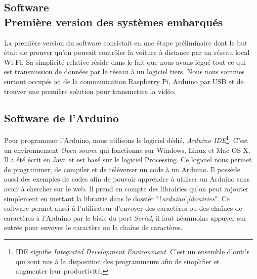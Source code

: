 \documentclass[a4paper,11pt]{report}
\begin{document}
{\begin{enumerate}
\begin{enumerate}
\chapter{Software \\  Première version des systèmes embarqués}

\lettrine{L}{a} première version du software consistait en une étape préliminaire dont le but était de prouver qu'on pouvait contrôler la voiture à distance par un réseau local Wi-Fi. Sa simplicité relative réside dans le fait que nous avons légué tout ce qui est transmission de données par le réseau à un logiciel tiers. Nous nous sommes surtout occupés ici de la communication Raspberry Pi, Arduino par USB et de trouver une première solution pour transmettre la vidéo.

\section{Software de l'Arduino}
Pour programmer l'Arduino, nous utilisons le logiciel dédié, \textit{Arduino IDE}\footnote{IDE signifie \textit{Integrated Development Environment}. C'est un ensemble d'outils qui sont mis à la disposition des programmeurs afin de simplifier et augmenter leur productivité.}. C'est un environnement \textit{Open source} qui fonctionne sur Windows, Linux et Mac OS X. Il a été écrit en Java et est basé sur le logiciel Processing.
Ce logiciel nous permet de programmer, de compiler et de téléverser un code à un Arduino. Il possède aussi des exemples de codes afin de pouvoir apprendre à utiliser un Arduino sans avoir à chercher sur le web. Il prend en compte des librairies qu'on peut rajouter simplement en mettant la librairie dans le dossier "\textit{\textbackslash arduino\textbackslash librairies}". Ce software permet aussi à l'utilisateur d'envoyer des caractères ou des chaînes de caractères à l'Arduino par le biais du port \textit{Serial}, il faut néanmoins appuyer sur entrée pour envoyer le caractère ou la chaîne de caractères.



\end{enumerate}
\end{enumerate}}
\end{document}
